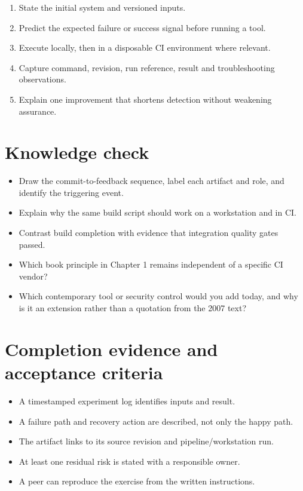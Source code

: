 \documentclass[11pt,letterpaper]{article}
\begin{document}
\begin{enumerate}
\item State the initial system and versioned inputs.
\item Predict the expected failure or success signal before running a tool.
\item Execute locally, then in a disposable CI environment where relevant.
\item Capture command, revision, run reference, result and troubleshooting observations.
\item Explain one improvement that shortens detection without weakening assurance.
\end{enumerate}
\section{Knowledge check}
\begin{itemize}
\item Draw the commit-to-feedback sequence, label each artifact and role, and identify the triggering event.
\item Explain why the same build script should work on a workstation and in CI.
\item Contrast build completion with evidence that integration quality gates passed.
\item Which book principle in Chapter 1 remains independent of a specific CI vendor?
\item Which contemporary tool or security control would you add today, and why is it an extension rather than a quotation from the 2007 text?
\end{itemize}
\section{Completion evidence and acceptance criteria}
\begin{itemize}
\item A timestamped experiment log identifies inputs and result.
\item A failure path and recovery action are described, not only the happy path.
\item The artifact links to its source revision and pipeline/workstation run.
\item At least one residual risk is stated with a responsible owner.
\item A peer can reproduce the exercise from the written instructions.
\end{itemize}
\end{document}
